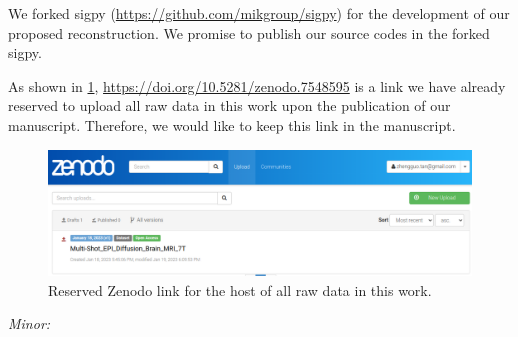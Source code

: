 \documentclass[a4paper,11pt,twoside]{report}
\begin{document}
\begin{enumerate}
    \hspace{1em} We forked sigpy (\url{https://github.com/mikgroup/sigpy}) for the development of
    our proposed reconstruction. We promise to publish our source codes in the forked sigpy.

    \hspace{1em} As shown in \cref{FIG:Zenodo},
    \url{https://doi.org/10.5281/zenodo.7548595} is a link we have already reserved
    to upload all raw data in this work upon the publication of our manuscript.
    Therefore, we would like to keep this link in the manuscript.

    \begin{figure}[ht]
        \centering
        \includegraphics[width=\textwidth]{fig_zenodo.png}
        \caption{Reserved Zenodo link for the host of all raw data in this work.}
        \label{FIG:Zenodo}
    \end{figure}
\end{enumerate}


\noindent \textit{Minor:}
\end{document}
